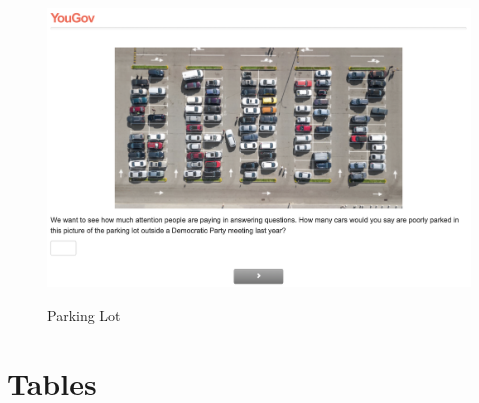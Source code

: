 \documentclass[12pt, letterpaper]{article}
\begin{document}
\begin{figure}[!htbp]
\centering
\caption{Parking Lot}
\includegraphics[scale=.4]{../data/treats/Parking_Lot_Dems.png}
\label{fig:mistakes_rep}
\end{figure}

\section{Tables}


\end{document}
